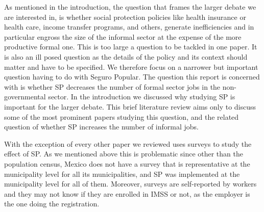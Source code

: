 \documentclass[oneside,11pt]{article}
\begin{document}
As mentioned in the introduction, the question that frames the larger debate we are interested in, is whether social protection policies like health insurance or health care, income transfer programs, and others, generate inefficiencies and in particular engross the size of the informal sector at the expense of the more productive formal one. This is too large a question to be tackled in one paper. It is also an ill posed question as the details of the policy and its context should matter and have to be specified. We therefore focus on a narrower but important question having to do with Seguro Popular. The question this report is concerned with is whether SP decreases the number of formal sector jobs in the non-governmental sector. In the introduction we discussed why studying SP is important for the larger debate. This brief literature review aims only to discuss some of the most prominent papers studying this question, and the related question of whether SP increases the number of informal jobs. 

With the exception of \cite{Campos} every other paper we reviewed uses surveys to study the effect of SP. As we mentioned above this is problematic since other than the population census, Mexico does not have a survey that is representative at the municipality level for all its municipalities, and SP was implemented at the municipality level for all of them. Moreover, surveys are self-reported by workers and they may not know if they are enrolled in IMSS or not, as the employer is the one doing the registration. 
\end{document}
